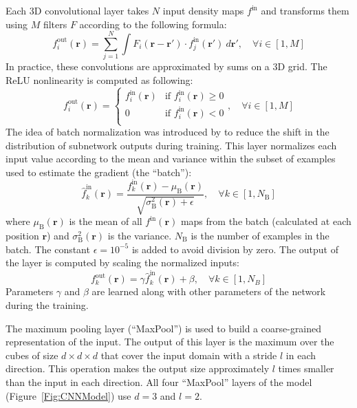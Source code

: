 \documentclass{bioinfo}
\begin{document}
Each 3D convolutional layer takes $N$ input density maps $f^\text{in}$
and transforms them using $M$ filters $F$ according to the following
formula:
\begin{equation}
f^\text{out}_i (\mathbf{r}) = \sum^{N}_{j=1} \int F_i (\mathbf{r} - \mathbf{r'}) \cdot f^\text{in}_j(\mathbf{r'}) ~d\mathbf{r'}, \quad\forall i \in [1,M]
\end{equation}
In practice, these convolutions are approximated by sums on a 3D grid.
The ReLU nonlinearity is computed as following:
\begin{equation}
f^\text{out}_i (\mathbf{r}) = \begin{cases}
               f^\text{in}_i(\mathbf{r}) &\text{if } f^\text{in}_i(\mathbf{r})\geq 0\\
               0                         &\text{if } f^\text{in}_i(\mathbf{r})<0\\
            \end{cases}, \quad\forall i \in [1,M]
\end{equation}
The idea of batch normalization was introduced by 
\citet{ioffe2015batch} to reduce the shift in the distribution of
subnetwork outputs during training. This layer normalizes each input
value according to the mean and variance within the subset of examples
used to estimate the gradient (the ``batch''):
\begin{equation}
\hat{f}^\text{in}_k(\mathbf{r}) = \frac{f^\text{in}_k(\mathbf{r}) - \mu_\text{B}(\mathbf{r})}{\sqrt{\sigma^{2}_\text{B}(\mathbf{r}) + \epsilon}}, \quad\forall k \in [1,N_\text{B}]
\end{equation}
where $\mu_\text{B}(\mathbf{r})$ is the mean of all
$f^\text{in}(\mathbf{r})$ maps from the batch (calculated at each
position $\mathbf{r}$) and $\sigma^{2}_\text{B}(\mathbf{r})$ is the
variance. $N_\text{B}$ is the number of examples in the batch. The constant
$\epsilon = 10^{-5}$ is added to avoid division by zero.
The output of the layer is computed by scaling the normalized inputs:
\begin{equation}
f^\text{out}_k(\mathbf{r}) = \gamma \hat{f}^\text{in}_k(\mathbf{r}) + \beta, \quad\forall k \in [1,N_B]
\end{equation}
Parameters $\gamma$ and $\beta$ are learned along with other
parameters of the network during the training.

The maximum pooling layer (``MaxPool'') is used to build a
coarse-grained representation of the input. The output of this layer
is the maximum over the cubes of size $d \times d \times d$ that cover
the input domain with a stride $l$ in each direction.  This operation
makes the output size approximately $l$ times smaller than the
input in each direction.  All four ``MaxPool'' layers of the model
(Figure~\ref{Fig:CNNModel}) use $d=3$ and $l=2$.
\end{document}
